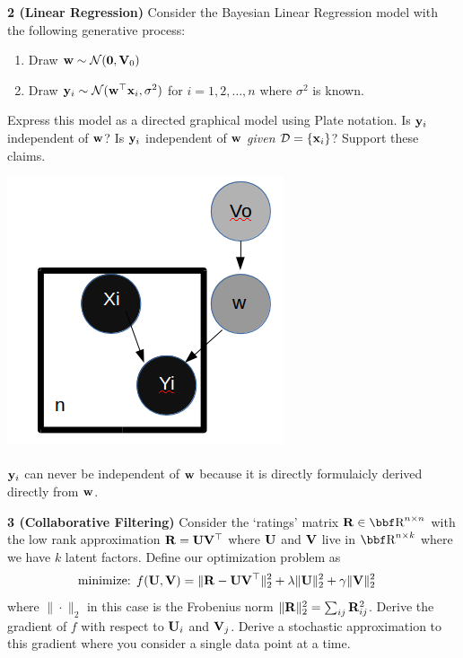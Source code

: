 \documentclass[12pt,letterpaper,fleqn]{hmcpset}
\begin{document}
\textbf{2 (Linear Regression)} Consider the Bayesian Linear Regression model with
the following generative process:
\begin{enumerate}[(1)]
    \item Draw ${\bf w} \sim {\cal N}({\bf 0}, \mathbf{V}_0)$
    \item Draw ${\bf y}_i \sim {\cal N}({\bf w}^\top{\bf x}_i, \sigma^2)$ for $i=1,2,\dots,n$ where $\sigma^2$
        is known.
\end{enumerate}
Express this model as a directed graphical model using Plate notation. Is ${\bf y}_i$
independent of ${\bf w}$? Is ${\bf y}_i$ independent of ${\bf w}$ \textit{given} ${\cal D} = \{{\bf x}_i\}$? Support
these claims.
\begin{solution}
    \includegraphics[scale = .5]{p2.png}\\\\
    ${\bf y}_i$ can never be independent of ${\bf w}$ because it is directly formulaicly derived directly from ${\bf w}$.
\end{solution}

\newpage

\textbf{3 (Collaborative Filtering)} Consider the `ratings' matrix $\Rb\in\RR^{n\times n}$
with the low rank approximation ${\bf R} = {\bf U} {\bf V}^\top$ where ${\bf U}$ and ${\bf V}$ live in
$\RR^{n\times k}$ where we have $k$ latent factors. Define our optimization problem as
\begin{align*}
    \text{minimize: } & f({\bf U},{\bf V}) = \|{\bf R} - {\bf U}{\bf V}^\top\|_2^2 + \lambda\|{\bf U}\|_2^2 + \gamma\|{\bf V}\|_2^2
\end{align*}
where $\|\cdot\|_2$ in this case is the Frobenius norm $\|{\bf R}\|_2^2 = \sum_{ij}{\bf R}_{ij}^2$.
Derive the gradient of $f$ with respect to ${\bf U}_i$ and ${\bf V}_j$. Derive a stochastic
approximation to this gradient where you consider a single data point at a time.\\
\end{document}

